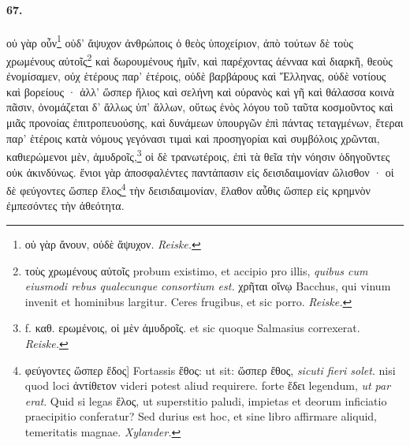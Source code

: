 \documentclass[a4paper, 11pt, oneside, polutonikogreek, german]{article}
\begin{document}
\paragraph{67.}
οὐ γὰρ οὖν\footnote{οὐ γὰρ ἄνουν, οὐδὲ ἄψυχον. \emph{Reiske.}} οὐδ' ἄψυχον ἀνθρώποις ὁ θεὸς ὑποχείριον, ἀπὸ τούτων δὲ τοὺς χρωμένους αὐτοῖς\footnote{τοὺς χρωμένους αὐτοῖς probum existimo, et accipio pro illis, \emph{quibus cum eiusmodi rebus qualecunque consortium est.} χρῆται οἴνῳ Bacchus, qui vinum invenit et hominibus largitur. Ceres frugibus, et sic porro. \emph{Reiske.}} καὶ δωρουμένους ἡμῖν, καὶ παρέχοντας ἀένναα καὶ διαρκῆ, θεοὺς ἐνομίσαμεν, οὐχ ἑτέρους παρ' ἑτέροις, οὐδὲ βαρβάρους καὶ Ἕλληνας, οὐδὲ νοτίους καὶ βορείους · ἀλλ' ὥσπερ ἥλιος καὶ σελήνη καὶ οὐρανὸς καὶ γῆ καὶ θάλασσα κοινὰ πᾶσιν, ὀνομάζεται δ' ἄλλως ὑπ' ἄλλων, οὕτως ἑνὸς λόγου τοῦ ταῦτα κοσμοῦντος καὶ μιᾶς προνοίας ἐπιτροπευούσης, καὶ δυνάμεων ὑπουργῶν ἐπὶ πάντας τεταγμένων, ἕτεραι παρ' ἑτέροις κατὰ νόμους γεγόνασι τιμαὶ καὶ προσηγορίαι καὶ συμβόλοις χρῶνται, καθιερώμενοι μὲν, ἀμυδροῖς,\footnote{f. καθ. ερωμένοις, οἱ μὲν ἀμυδροῖς. et sic quoque Salmasius correxerat. \emph{Reiske.}} οἱ δὲ τρανωτέροις, ἐπὶ τὰ θεῖα τὴν νόησιν ὁδηγοῦντες οὐκ ἀκινδύνως. ἔνιοι γὰρ ἀποσφαλέντες παντάπασιν εἰς δεισιδαιμονίαν ὤλισθον · οἱ δὲ φεύγοντες ὥσπερ ἕλος\footnote{φεύγοντες ὥσπερ ἔδος] Fortassis ἔθος: ut sit: ὥσπερ ἔθος, \emph{sicuti fieri solet}. nisi quod loci ἀντίθετον videri potest aliud requirere. forte ἔδει legendum, \emph{ut par erat}. Quid si legas ἕλος, ut superstitio paludi, impietas et deorum inficiatio praecipitio conferatur? Sed durius est hoc, et sine libro affirmare aliquid, temeritatis magnae. \emph{Xylander.} } τὴν δεισιδαιμονίαν, ἔλαθον αὖθις ὥσπερ εἰς κρημνὸν ἐμπεσόντες τὴν ἀθεότητα.
\end{document}
